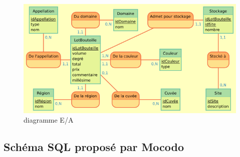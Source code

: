 \documentclass[11pt]{article}
\makeatletter
\def\maxwidth{\ifdim\Gin@nat@width>\linewidth\linewidth
    \else\Gin@nat@width\fi}
\let\Oldincludegraphics\includegraphics
\renewcommand{\includegraphics}[1]{\Oldincludegraphics[width=.8\maxwidth]{#1}}
\makeatother
\begin{document}
\begin{figure}
\centering
\includegraphics{mocodo/Lotbouteilles/Lotbouteilles.png}
\caption{diagramme E/A}
\end{figure}

    \hypertarget{schuxe9ma-sql-proposuxe9-par-mocodo}{%
\subsection{Schéma SQL proposé par
Mocodo}\label{schuxe9ma-sql-proposuxe9-par-mocodo}}
\end{document}
